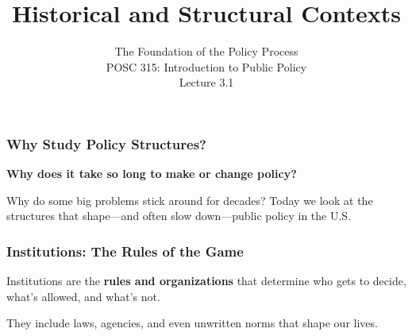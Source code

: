\documentclass[10pt]{beamer}
\begin{document}
\title{Historical and Structural Contexts}
\subtitle{The Foundation of the Policy Process\\POSC 315: Introduction to Public Policy\\Lecture 3.1}
\date{}

\maketitle

\begin{frame}
\frametitle{Why Study Policy Structures?}

\begin{block}{}
\textbf{Why does it take so long to make or change policy?}

Why do some big problems stick around for decades? Today we look at the structures that shape---and often slow down---public policy in the U.S.
\end{block}

\end{frame}

\begin{frame}
\frametitle{Institutions: The Rules of the Game}

\begin{block}{}
Institutions are the \textbf{rules and organizations} that determine who gets to decide, what's allowed, and what's not.

They include laws, agencies, and even unwritten norms that shape our lives.
\end{block}

\end{frame}
\end{document}
